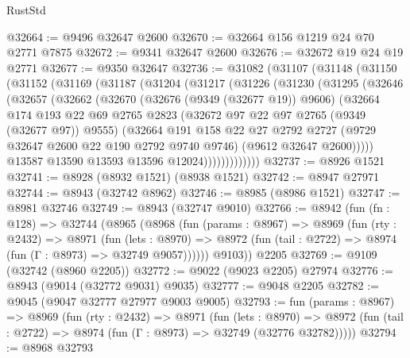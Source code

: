 \begin{lexlean}{RustStd}
\begin{coremodule}
{\begin{coremodule}
{{{{{{{{{{{{{{{{{{{{{{{{{{{{{{{{{{{{{{{@32664 := @9496 @32647 @2600
@32670 := @32664 @156 @1219 @24 @70 @2771 @7875
@32672 := @9341 @32647 @2600
@32676 := @32672 @19 @24 @19 @2771
@32677 := @9350 @32647
@32736 := @31082
    (@31107
      (@31148
        (@31150
          (@31152
            (@31169
              (@31187
                (@31204
                  (@31217
                    (@31226
                      (@31230
                        (@31295
                          (@32646
                            (@32657
                              (@32662
                                (@32670
                                  (@32676 (@9349 (@32677 @19)) @9606)
                                  (@32664
                                    @174
                                    @193
                                    @22
                                    @69
                                    @2765
                                    @2823
                                    (@32672 @97 @22 @97 @2765 (@9349 (@32677 @97)) @9555)
                                    (@32664
                                      @191
                                      @158
                                      @22
                                      @27
                                      @2792
                                      @2727
                                      (@9729 @32647 @2600 @22 @190 @2792 @9740 @9746)
                                      (@9612 @32647 @2600)))))
                              @13587
                              @13590
                              @13593
                              @13596
                              @12024)))))))))))))
@32737 := @8926 @1521
@32741 := @8928 (@8932 @1521) (@8938 @1521)
@32742 := @8947 @27971
@32744 := @8943 (@32742 @8962)
@32746 := @8985 (@8986 @1521)
@32747 := @8981 @32746
@32749 := @8943 (@32747 @9010)
@32766 := @8942
    (fun (fn : @128) =>
    @32744
      (@8965
        (@8968
          (fun (params : @8967) =>
          @8969
            (fun (rty : @2432) =>
            @8971
              (fun (lets : @8970) =>
              @8972 (fun (tail : @2722) => @8974 (fun (Γ : @8973) => @32749 @9057))))))
        @9103))
    @2205
@32769 := @9109 (@32742 (@8960 @2205))
@32772 := @9022 (@9023 @2205) @27974
@32776 := @8943 (@9014 (@32772 @9031) @9035)
@32777 := @9048 @2205
@32782 := @9045 (@9047 @32777 @27977 @9003 @9005)
@32793 := fun (params : @8967) =>
  @8969
    (fun (rty : @2432) =>
    @8971
      (fun (lets : @8970) =>
      @8972 (fun (tail : @2722) => @8974 (fun (Γ : @8973) => @32749 (@32776 @32782)))))
@32794 := @8968 @32793
}}}}}}}}}}}}}}}}}}}}}}}}}}}}}}}}}}}}}}}
\end{coremodule}}
\end{coremodule}
\end{lexlean}
